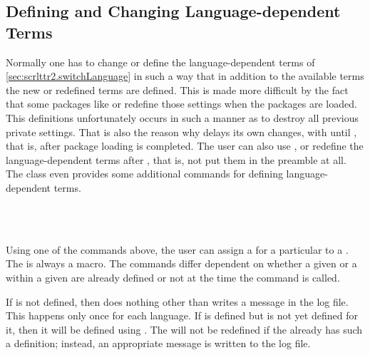 \subsection{Defining and Changing Language-dependent Terms}
\label{sec:scrlttr2.defLanguageTerms}
\begin{Explain}
  Normally one has to change or define the language-dependent terms of
  \autoref{sec:scrlttr2.switchLanguage} in such a way that in addition
  to the available terms the new or redefined terms are defined. This
  is made more difficult by the fact that some packages like
   or
   redefine those settings when
  the packages are loaded. This definitions unfortunately occurs in
  such a manner as to destroy all previous private settings. That is
  also the reason why  delays its own changes, with
   until ,
  that is, after package loading is completed. The user can also use
  , or redefine the language-dependent terms
  after , that is, not put them in
  the preamble at all. The class  even provides some
  additional commands for defining language-dependent terms.
\end{Explain}

\begin{Declaration}
    \\
    \\
\end{Declaration}
%
%
%
Using one of the commands above, the user can assign a
 for a particular  to a
.  The  is always a macro. The commands differ
dependent on whether a given  or a  within
a given  are already defined or not at the time the
command is called.

If  is not defined, then 
does nothing other than writes a message in the log file. This happens
only once for each language.  If  is defined but
 is not yet defined for it, then it will be defined using
.  The  will not be redefined if the
 already has such a definition; instead, an
appropriate message is written to the log file.

